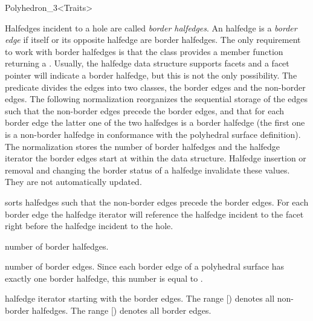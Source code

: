 \begin{ccRefClass}{Polyhedron_3<Traits>}
\begin{ccAdvanced}

Halfedges incident to a hole are called {\em border halfedges}. An
halfedge is a {\em border edge\/} if itself or its opposite halfedge
are border halfedges. The only requirement to work with border
halfedges is that the  class provides a member function
 returning a . Usually, the halfedge data
structure supports facets and a  facet pointer will indicate
a border halfedge, but this is not the only possibility. The
 predicate divides the edges into two classes, the
border edges and the non-border edges. The following normalization
reorganizes the sequential storage of the edges such that the
non-border edges precede the border edges, and that for each border
edge the latter one of the two halfedges is a border halfedge (the
first one is a non-border halfedge in conformance with the polyhedral
surface definition). The normalization stores the number of border
halfedges and the halfedge iterator the border edges start at within
the data structure.  Halfedge insertion or removal and changing the
border status of a halfedge invalidate these values. They are not
automatically updated.


    {sorts halfedges such that the non-border edges precede the
     border edges. For each border edge the halfedge iterator will
    reference the halfedge incident to the facet right before the
    halfedge incident to the hole.}

    {number of border halfedges.
    }

    {number of border edges. Since each border edge of a polyhedral
    surface has exactly one border halfedge,
    this number is equal to .
    }

    {halfedge iterator starting with the border edges. The range
      [) denotes
    all non-border halfedges. The range
    [) denotes all
    border edges.
    }


\end{ccAdvanced}
\end{ccRefClass}
